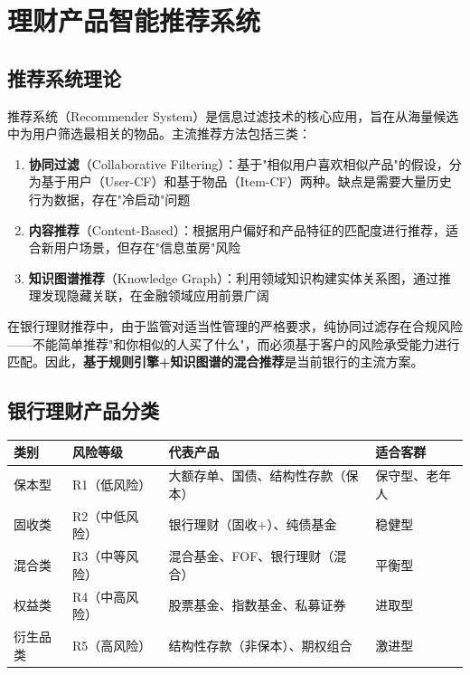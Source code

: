 \section{理财产品智能推荐系统}

\subsection{推荐系统理论}

推荐系统（Recommender System）是信息过滤技术的核心应用，旨在从海量候选中为用户筛选最相关的物品。主流推荐方法包括三类：

\begin{enumerate}[leftmargin=2em]
  \item \textbf{协同过滤}（Collaborative Filtering）：基于"相似用户喜欢相似产品"的假设，分为基于用户（User-CF）和基于物品（Item-CF）两种。缺点是需要大量历史行为数据，存在"冷启动"问题
  \item \textbf{内容推荐}（Content-Based）：根据用户偏好和产品特征的匹配度进行推荐，适合新用户场景，但存在"信息茧房"风险
  \item \textbf{知识图谱推荐}（Knowledge Graph）：利用领域知识构建实体关系图，通过推理发现隐藏关联，在金融领域应用前景广阔
\end{enumerate}

在银行理财推荐中，由于监管对适当性管理的严格要求，纯协同过滤存在合规风险——不能简单推荐"和你相似的人买了什么"，而必须基于客户的风险承受能力进行匹配。因此，\textbf{基于规则引擎+知识图谱的混合推荐}是当前银行的主流方案。

\subsection{银行理财产品分类}

\begin{table}[H]
\centering
\begin{tabular}{llp{3.5cm}p{4cm}}
\toprule
\textbf{类别} & \textbf{风险等级} & \textbf{代表产品} & \textbf{适合客群} \\
\midrule
保本型 & R1（低风险） & 大额存单、国债、结构性存款（保本） & 保守型、老年人 \\
固收类 & R2（中低风险） & 银行理财（固收+）、纯债基金 & 稳健型 \\
混合类 & R3（中等风险） & 混合基金、FOF、银行理财（混合） & 平衡型 \\
权益类 & R4（中高风险） & 股票基金、指数基金、私募证券 & 进取型 \\
衍生品类 & R5（高风险） & 结构性存款（非保本）、期权组合 & 激进型 \\
\bottomrule
\end{tabular}
\end{table}

